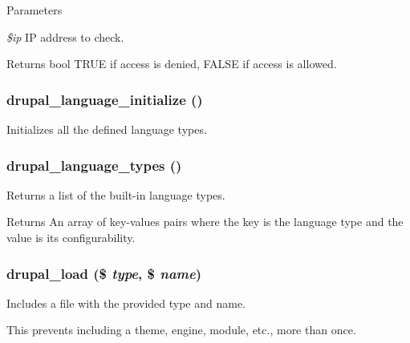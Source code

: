 \begin{DoxyParams}{Parameters}
\item[{\em \$ip}]IP address to check.\end{DoxyParams}
\begin{DoxyReturn}{Returns}
bool TRUE if access is denied, FALSE if access is allowed. 
\end{DoxyReturn}
\hypertarget{bootstrap_8inc_a8abdce8019511ce4a74d3d9b48a93717}{
\subsubsection[{drupal\_\-language\_\-initialize}]{\setlength{\rightskip}{0pt plus 5cm}drupal\_\-language\_\-initialize ()}}
\label{bootstrap_8inc_a8abdce8019511ce4a74d3d9b48a93717}
Initializes all the defined language types. \hypertarget{bootstrap_8inc_a663476297a1e5f0b01dd2e063757392a}{
\subsubsection[{drupal\_\-language\_\-types}]{\setlength{\rightskip}{0pt plus 5cm}drupal\_\-language\_\-types ()}}
\label{bootstrap_8inc_a663476297a1e5f0b01dd2e063757392a}
Returns a list of the built-\/in language types.

\begin{DoxyReturn}{Returns}
An array of key-\/values pairs where the key is the language type and the value is its configurability. 
\end{DoxyReturn}
\hypertarget{bootstrap_8inc_a13a2254228f213a980dc1f09886b8802}{
\subsubsection[{drupal\_\-load}]{\setlength{\rightskip}{0pt plus 5cm}drupal\_\-load (\$ {\em type}, \/  \$ {\em name})}}
\label{bootstrap_8inc_a13a2254228f213a980dc1f09886b8802}
Includes a file with the provided type and name.

This prevents including a theme, engine, module, etc., more than once.


